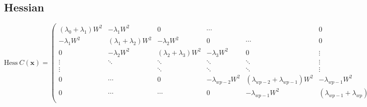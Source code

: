 \documentclass {article}
\newcommand\cost{C}
\newcommand\state{\mathbf{x}}
\newcommand\weight{W}
\begin{document}
\subsection {Hessian}
{\tiny
\begin{equation}\label{eq:hessian-cost}
\mbox{Hess}\ \cost (\state) = \left(\begin{array}{cccccc}
(\lambda_{0}+\lambda_{1})\weight^2 & -\lambda_{1}\weight^2 & 0 & \cdots & & 0 \\
-\lambda_{1}\weight^2 & (\lambda_{1}+\lambda_{2})\weight^2 & -\lambda_{2}\weight^2 & 0 & \cdots & 0 \\
0 & -\lambda_{2}\weight^2 &  (\lambda_{2}+\lambda_{3})\weight^2 & -\lambda_{3}\weight^2 & 0 & \vdots \\
\vdots & \ddots & \ddots & \ddots & \ddots & \vdots\\
\vdots & & \ddots & \ddots & \ddots & \vdots\\
0 & \cdots  & 0 & -\lambda_{wp-2}\weight^2 & (\lambda_{wp-2}+\lambda_{wp-1})\weight^2 & -\lambda_{wp-1}\weight^2 \\
0 & \cdots &  \cdots & 0 & -\lambda_{wp-1}\weight^2 & (\lambda_{wp-1}+\lambda_{wp})\weight^2  \\
\end{array}\right)
\end{equation}
}
\end{document}
